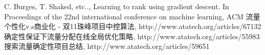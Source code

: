 \begin{thebibliography}{99}
 C. Burges, T. Shaked, etc.., Learning to rank 
using gradient descent. In Proceedings of the 22nd international 
conference on machine learning, ACM
 流量个性化v.s商业化 - 双11珠峰项目中控算法, http://www.atatech.org/articles/67132
 确定性保证下流量分配在线全局优化策略, http://www.atatech.org/articles/55983
 搜索流量确定性项目总结, http://www.atatech.org/articles/59651
\end{thebibliography}

 
